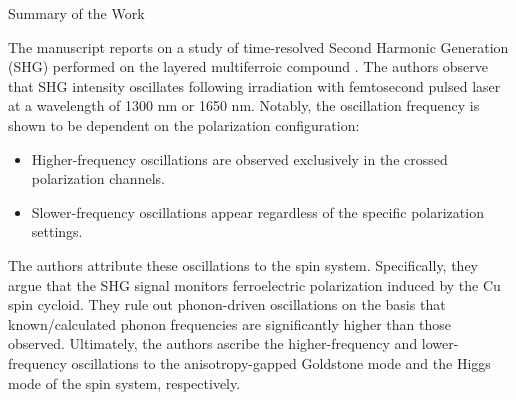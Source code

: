 Summary of the Work

The manuscript reports on a study of time-resolved Second Harmonic Generation (SHG) performed on the layered multiferroic compound . The authors observe that SHG intensity oscillates following irradiation with femtosecond pulsed laser at a wavelength of 1300 nm or 1650 nm. Notably, the oscillation frequency is shown to be dependent on the polarization configuration:
\begin{itemize}
    \item Higher-frequency oscillations are observed exclusively in the crossed polarization channels.
    \item Slower-frequency oscillations appear regardless of the specific polarization settings.
\end{itemize}
The authors attribute these oscillations to the spin system. Specifically, they argue that the SHG signal monitors ferroelectric polarization induced by the Cu spin cycloid. They rule out phonon-driven oscillations on the basis that known/calculated phonon frequencies are significantly higher than those observed. Ultimately, the authors ascribe the higher-frequency and lower-frequency oscillations to the anisotropy-gapped Goldstone mode and the Higgs mode of the spin system, respectively.
